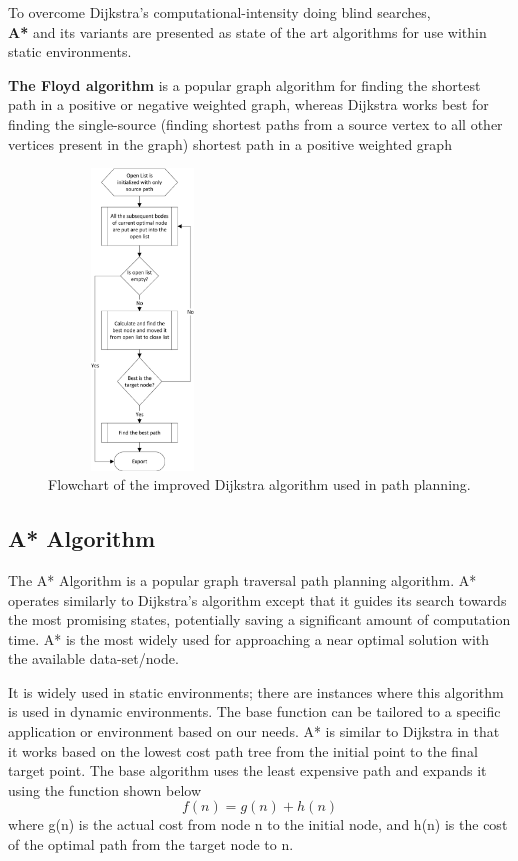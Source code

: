 \documentclass[11pt]{article}
\begin{document}
To overcome Dijkstra’s computational-intensity doing blind searches, \\ 
\textbf{A*} and its variants
are presented as state of the art algorithms for use within static environments.

\textbf{The Floyd algorithm} is a popular graph algorithm for finding the shortest path in
a positive or negative weighted graph, whereas Dijkstra works best for finding the single-source (finding shortest paths from a source vertex to all other vertices present in
the graph) shortest path in a positive weighted graph

\begin{figure}[h]
\includegraphics[width = 5cm,height = 8cm]{Dijkstra}
\caption{Flowchart of the improved Dijkstra algorithm used in path planning.}
\end{figure}


\subsection{A* Algorithm}

The A* Algorithm is a popular graph traversal path planning algorithm. A* operates
similarly to Dijkstra’s algorithm except that it guides its search towards the most promising
states, potentially saving a significant amount of computation time. A* is the most
widely used for approaching a near optimal solution with the available data-set/node.

It is widely used in static environments; there are instances where this algorithm
is used in dynamic environments. The base function can be tailored to a specific
application or environment based on our needs. A* is similar to Dijkstra in that it works
based on the lowest cost path tree from the initial point to the final target point. The base
algorithm uses the least expensive path and expands it using the function shown below$$f(n) = g(n) + h(n)$$
where g(n) is the actual cost from node n to the initial node, and h(n) is the cost of the
optimal path from the target node to n.
\end{document}
